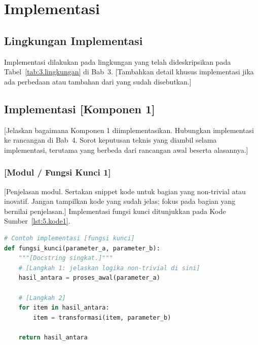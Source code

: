 
\chapter{Implementasi}

\section{Lingkungan Implementasi}
\label{sec:5.1}

Implementasi dilakukan pada lingkungan yang telah dideskripsikan pada
Tabel~\ref{tab:3.lingkungan} di Bab~3. [Tambahkan detail khusus implementasi jika ada
perbedaan atau tambahan dari yang sudah disebutkan.]

\section{Implementasi [Komponen 1]}
\label{sec:5.2}

[Jelaskan bagaimana Komponen 1 diimplementasikan. Hubungkan implementasi ke rancangan
di Bab~4. Sorot keputusan teknis yang diambil selama implementasi, terutama yang berbeda
dari rancangan awal beserta alasannya.]

\subsection{[Modul / Fungsi Kunci 1]}
\label{sec:5.2.1}

[Penjelasan modul. Sertakan snippet kode untuk bagian yang non-trivial atau inovatif.
Jangan tampilkan kode yang sudah jelas; fokus pada bagian yang bernilai penjelasan.]
Implementasi fungsi kunci ditunjukkan pada Kode Sumber~\ref{lst:5.kode1}.

\begin{lstlisting}[language=Python, caption={Implementasi fungsi kunci}, label={lst:5.kode1}]
# Contoh implementasi [fungsi kunci]
def fungsi_kunci(parameter_a, parameter_b):
    """[Docstring singkat.]"""
    # [Langkah 1: jelaskan logika non-trivial di sini]
    hasil_antara = proses_awal(parameter_a)

    # [Langkah 2]
    for item in hasil_antara:
        item = transformasi(item, parameter_b)

    return hasil_antara
\end{lstlisting}

